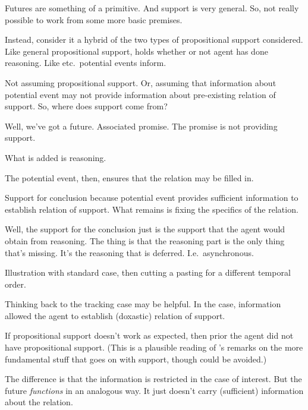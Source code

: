 \begin{note}
  Futures are something of a primitive.
  And support is very general.
  So, not really possible to work from some more basic premises.

  Instead, consider it a hybrid of the two types of propositional support considered.
  Like general propositional support, holds whether or not agent has done reasoning.
  Like \citeauthor{Goldman:1979ui} etc.\ potential events inform.

  Not assuming propositional support.
  Or, assuming that information about potential event may not provide information about pre-existing relation of support.
  So, where does support come from?

  Well, we've got a future.
  Associated promise.
  The promise is not providing support.

  What is added is reasoning.

  The potential event, then, ensures that the relation may be filled in.

  Support for conclusion because potential event provides sufficient information to establish relation of support.
  What remains is fixing the specifics of the relation.

  Well, the support for the conclusion just is the support that the agent would obtain from reasoning.
  The thing is that the reasoning part is the only thing that's missing.
  It's the reasoning that is deferred.
  I.e.\ asynchronous.

  Illustration with standard case, then cutting a pasting for a different temporal order.
\end{note}

\begin{note}
  Thinking back to the tracking case may be helpful.
  In the case, information allowed the agent to establish (doxastic) relation of support.

  If propositional support doesn't work as expected, then prior the agent did not have propositional support.
  (This is a plausible reading of \citeauthor{Turri:2010aa}'s remarks on the more fundamental stuff that goes on with support, though could be avoided.)

  The difference is that the information is restricted in the case of interest.
  But the future \emph{functions} in an analogous way.
  It just doesn't carry (sufficient) information about the relation.
\end{note}


